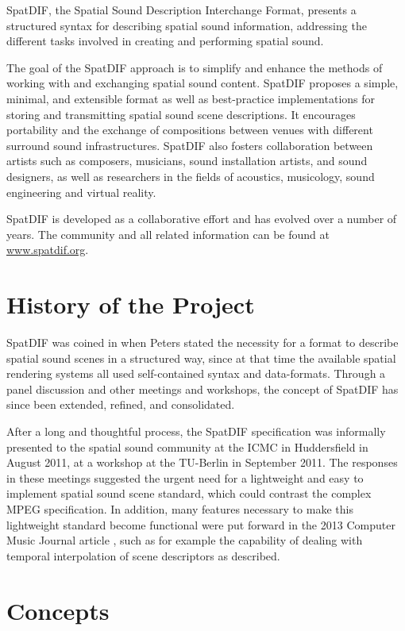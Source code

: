 \documentclass[a4paper]{article}
\begin{document}
SpatDIF, the Spatial Sound Description Interchange Format, presents a structured syntax for describing spatial sound information, addressing the different tasks involved in creating and performing spatial sound.

The goal of the SpatDIF approach is to simplify and enhance the methods of working with and exchanging spatial sound content. 
SpatDIF proposes a simple, minimal, and extensible format as well as best-practice implementations for storing and transmitting spatial sound scene descriptions. 
It encourages portability and the exchange of compositions between venues with different surround sound infrastructures. 
SpatDIF also fosters collaboration between artists such as composers, musicians, sound installation artists, and sound designers, as well as researchers in the fields of acoustics, musicology, sound engineering and virtual reality.

SpatDIF is developed as a collaborative effort and has evolved over a number of years. 
The community and all related information can be found at \url{www.spatdif.org}.

\section{History of the Project} %
SpatDIF was coined in \citeyear{peters_caa07} \cite{peters_caa07} when Peters stated the necessity for a format to describe spatial sound scenes in a structured way, since at that time the available spatial rendering systems all used self-contained syntax and data-formats. 
Through a panel discussion \cite{2008ICMCpanel, Peters:2008spatdif} and other meetings and workshops, the concept of SpatDIF has since been extended, refined, and consolidated. 

After a long and thoughtful process, the SpatDIF specification was informally presented to the spatial sound community at the ICMC in Huddersfield in August 2011, at a workshop at the TU-Berlin in September 2011.
The responses in these meetings suggested the urgent need for a lightweight and easy to implement spatial sound scene standard, which could contrast the complex MPEG specification.
In addition, many features necessary to make this lightweight standard become functional were put forward in the 2013 Computer Music Journal article \cite{Peters:2013SpatDifCMJ}, such as for example the capability of dealing with temporal interpolation of scene descriptors as described.

\section{Concepts}
\end{document}
